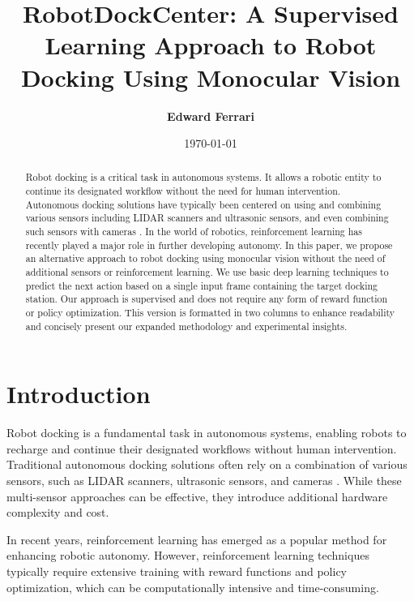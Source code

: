 \documentclass[twocolumn]{article}
\begin{document}
\title{\textbf{RobotDockCenter: A Supervised Learning Approach to Robot Docking Using Monocular Vision}}
\author{\textbf{Edward Ferrari}}
\date{\today}

\maketitle

\begin{abstract}
Robot docking is a critical task in autonomous systems. 
It allows a robotic entity to continue its designated workflow without the need for human intervention. 
Autonomous docking solutions have typically been centered on using and combining various sensors including LIDAR scanners and ultrasonic sensors, and even combining such sensors with cameras \citep{app131910675}. 
In the world of robotics, reinforcement learning has recently played a major role in further developing autonomy. 
In this paper, we propose an alternative approach to robot docking using monocular vision without the need of additional sensors or reinforcement learning. 
We use basic deep learning techniques to predict the next action based on a single input frame containing the target docking station.
Our approach is supervised and does not require any form of reward function or policy optimization.
This version is formatted in two columns to enhance readability and concisely present our expanded methodology and experimental insights.
\end{abstract}

\section{Introduction}
Robot docking is a fundamental task in autonomous systems, enabling robots to recharge and continue their designated workflows without human intervention. Traditional autonomous docking solutions often rely on a combination of various sensors, such as LIDAR scanners, ultrasonic sensors, and cameras \citep{app131910675}. While these multi-sensor approaches can be effective, they introduce additional hardware complexity and cost.

In recent years, reinforcement learning has emerged as a popular method for enhancing robotic autonomy. However, reinforcement learning techniques typically require extensive training with reward functions and policy optimization, which can be computationally intensive and time-consuming.
\end{document}
